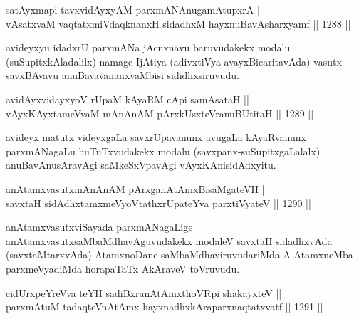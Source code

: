 
\begin{shl}
satAyxmapi tavxvidAyxyAM parxmANAnugamAtupxrA || \\
vAsatxvaM vaqtatxmiVdaqknanxH sidadhxM hayxnuBavAsharxyamf ||  1288 || 
\end{shl}

\begin{artha}
avideyxyu idadxrU parxmANa jAcnxnavu baruvudakekx modalu (suSupitxkAladalilx) namage IjAtiya (adivxtiVya avayxBicaritavAda) vasutx savxBAvavu anuBavavananxvaMbisi sididhxsiruvudu.
\end{artha}

\begin{shl}
avidAyxvidayxyoV rUpaM kAyaRM cApi samAsataH || \\
vAyxKAyxtameVvaM mAnAnAM pArxkUsxteVranuBUtitaH ||  1289 ||  
\end{shl}

\begin{artha}
avideyx matutx videyxgaLa savxrUpavanunx avugaLa kAyaRvanunx parxmANagaLu huTuTxvudakekx modalu (savxpanx-suSupitxgaLalalx) anuBavAnusAravAgi saMkeSxVpavAgi vAyxKAnisidAdxyitu.
\end{artha}

\begin{shl}
anAtamxvasutxmAnAnAM pArxganAtAmxBisaMgateVH ||  \\
savxtaH sidAdhxtamxmeVyoVtathxrUpateYva parxtiVyateV ||  1290 ||  
\end{shl}

\begin{artha}
anAtamxvasutxviSayada parxmANagaLige anAtamxvasutxsaMbaMdhavAguvudakekx modaleV savxtaH sidadhxvAda (savxtaMtarxvAda) AtamxnoDane saMbaMdhaviruvudariMda A AtamxneMba parxmeVyadiMda horapaTaTx AkAraveV toVruvudu.
\end{artha}


\begin{shl}
cidUrxpeYreVva teYH sadiBxranAtAmxthoVR\s pi shakayxteV || \\
parxmAtuM tadaqteV\s nAtAmx hayxnadhxkAraparxnaqtatxvatf ||  1291 ||  
\end{shl}

